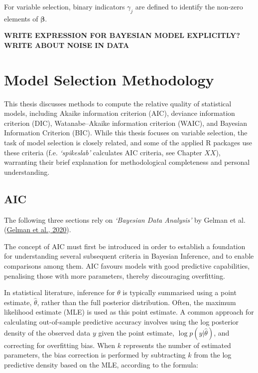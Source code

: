 \documentclass[
  11pt,
]{article}
\begin{document}
For variable selection, binary indicators \(\gamma_j\) are defined to
identify the non-zero elements of \(\boldsymbol{\beta}\).

\textbf{WRITE EXPRESSION FOR BAYESIAN MODEL EXPLICITLY?} \textbf{WRITE
ABOUT NOISE IN DATA}

\newpage

\section{Model Selection Methodology}

This thesis discusses methods to compute the relative quality of
statistical models, including Akaike information criterion (AIC),
deviance information criterion (DIC), Watanabe--Akaike information
criterion (WAIC), and Bayesian Information Criterion (BIC). While this
thesis focuses on variable selection, the task of model selection is
closely related, and some of the applied R packages use these criteria
(f.e. \emph{`spikeslab'} calculates AIC criteria, see Chapter \(XX\)),
warranting their brief explanation for methodological completeness and
personal understanding.

\subsection{AIC}

The following three sections rely on \emph{`Bayesian Data Analysis'} by
Gelman et al. (\protect\hyperlink{ref-Gelman2020}{Gelman et al., 2020}).

The concept of AIC must first be introduced in order to establish a
foundation for understanding several subsequent criteria in Bayesian
Inference, and to enable comparisons among them. AIC favours models with
good predictive capabilities, penalising those with more parameters,
thereby discouraging overfitting.

In statistical literature, inference for \(\theta\) is typically
summarised using a point estimate, \(\hat{\theta}\), rather than the
full posterior distribution. Often, the maximum likelihood estimate
(MLE) is used as this point estimate. A common approach for calculating
out-of-sample predictive accuracy involves using the log posterior
density of the observed data \(y\) given the point estimate,
\(\log p(y|\hat{\theta})\), and correcting for overfitting bias. When
\(k\) represents the number of estimated parameters, the bias correction
is performed by subtracting \(k\) from the log predictive density based
on the MLE, according to the formula:
\end{document}
